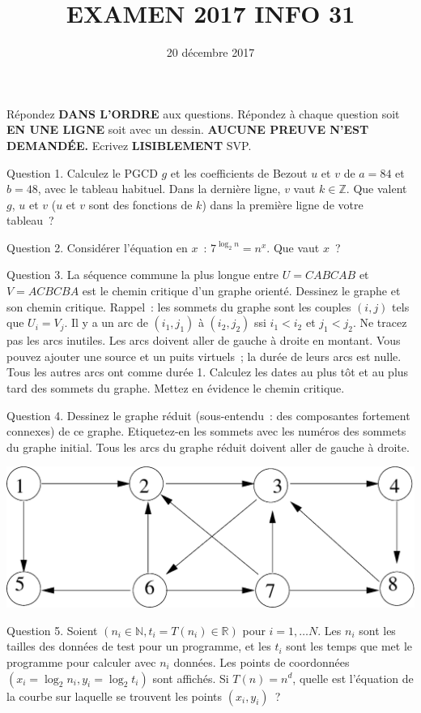 \documentclass[a4paper,12pt]{article}
\def\N{\mathbb{N}}
\def\Z{\mathbb{Z}}
\def\R{\mathbb{R}}
\begin{document}
\title{EXAMEN 2017 INFO 31}
\date{20 décembre 2017}
\maketitle
Répondez {\bf DANS L'ORDRE} aux questions. Répondez à chaque question soit {\bf EN UNE LIGNE} soit avec un dessin. {\bf AUCUNE PREUVE N'EST DEMANDÉE.} Ecrivez 
{\bf LISIBLEMENT} SVP.

Question 1. Calculez le PGCD $g$ et les coefficients de Bezout $u$ et $v$ de $a=84$ et $b=48$, avec le tableau habituel.
Dans la dernière ligne,  $v$ vaut $k\in\Z$.
Que valent $g$,  $u$ et $v$ ($u$ et $v$ sont des fonctions de $k$) dans la première ligne de votre tableau~? 

Question 2. Considérer l'équation en $x$~: $7^{\log_2 n}=n^x$.  Que vaut $x$~?

Question 3. La séquence commune la plus longue entre $U=CABCAB$ et $V=ACBCBA$ 
est le chemin critique d'un graphe orienté. Dessinez le graphe et son chemin critique.
Rappel~: les sommets
du graphe sont les couples $(i, j)$ tels que $U_i=V_j$. Il y a un arc  de $(i_1, j_1)$ à
$(i_2, j_2)$ ssi $i_1 < i_2$ et $j_1< j_2$. Ne tracez pas les arcs inutiles. 
Les arcs doivent aller de gauche à droite en montant.
Vous pouvez ajouter une source et un puits virtuels~; la durée de leurs arcs est nulle.
Tous les autres arcs ont comme durée 1.
Calculez les dates au plus tôt et au plus tard des sommets du graphe. Mettez en évidence le chemin critique.

Question 4. Dessinez le graphe réduit (sous-entendu~: des composantes fortement connexes) de ce graphe. Etiquetez-en les sommets avec les numéros des sommets du graphe initial. Tous les arcs du graphe réduit  doivent aller de gauche à droite.

\begin{center}
\includegraphics[width=0.55\linewidth]{graphe2017.eps}
\end{center}



Question 5. Soient $(n_i\in\N, t_i=T(n_i)\in \R)$ pour $i=1, \ldots N$. Les $n_i$ sont les
tailles des données de test pour un programme, et les $t_i$ sont les temps que met le programme pour calculer avec $n_i$ données.  
Les points de coordonnées $(x_i=\log_2 n_i, y_i=\log_2 t_i)$ sont affichés.
Si $T(n)=n^d$, quelle est l'équation de la courbe
sur laquelle se trouvent les points $(x_i, y_i)$~?  
\end{document}
